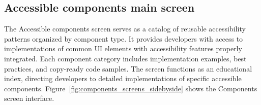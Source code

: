 \subsection{Accessible components main screen}

The Accessible components screen serves as a catalog of reusable accessibility patterns organized by component type. It provides developers with access to implementations of common UI elements with accessibility features properly integrated. Each component category includes implementation examples, best practices, and copy-ready code samples. The screen functions as an educational index, directing developers to detailed implementations of specific accessible components. Figure~\ref{fig:components_screens_sidebyside} shows the Components screen interface.

\begin{figure}[ht]
    \centering
    \begin{subfigure}[b]{0.48\textwidth}
        \centering

\end{subfigure}
\end{figure}
